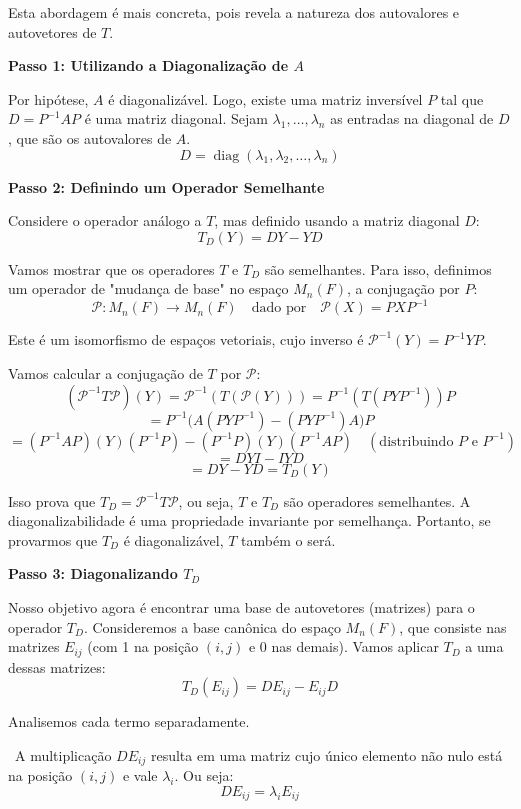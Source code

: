 Esta abordagem é mais concreta, pois revela a natureza dos autovalores e autovetores de $T$.

\textbf{Passo 1: Utilizando a Diagonalização de $A$}

Por hipótese, $A$ é diagonalizável. Logo, existe uma matriz inversível $P$ tal que
$D = P^{-1}AP$ é uma matriz diagonal. Sejam $\lambda_1, \ldots, \lambda_n$ as entradas na diagonal de $D$, que são os autovalores de $A$.
\[
D = \operatorname{diag}(\lambda_1, \lambda_2, \ldots, \lambda_n)
\]

\textbf{Passo 2: Definindo um Operador Semelhante}

Considere o operador análogo a $T$, mas definido usando a matriz diagonal $D$:
\[
T_D(Y) = DY - YD
\]

Vamos mostrar que os operadores $T$ e $T_D$ são semelhantes. Para isso, definimos um operador de
"mudança de base" no espaço $M_n(F)$, a conjugação por $P$:
\[
\mathcal{P} : M_n(F) \to M_n(F) \quad \text{dado por} \quad \mathcal{P}(X) = PXP^{-1}
\]

Este é um isomorfismo de espaços vetoriais, cujo inverso é $\mathcal{P}^{-1}(Y) = P^{-1}YP$.

Vamos calcular a conjugação de $T$ por $\mathcal{P}$:
\[
(\mathcal{P}^{-1} T \mathcal{P})(Y) = \mathcal{P}^{-1}(T(\mathcal{P}(Y)))
= P^{-1}(T(PYP^{-1}))P
\]
\[
= P^{-1}\big( A(PYP^{-1}) - (PYP^{-1})A \big)P
\]
\[
= (P^{-1}AP)(Y)(P^{-1}P) - (P^{-1}P)(Y)(P^{-1}AP) \quad (\text{distribuindo $P$ e $P^{-1}$})
\]
\[
= DYI - IYD
\]
\[
= DY - YD = T_D(Y)
\]

Isso prova que $T_D = \mathcal{P}^{-1}T\mathcal{P}$, ou seja, $T$ e $T_D$ são operadores semelhantes. A
diagonalizabilidade é uma propriedade invariante por semelhança. Portanto, se provarmos que $T_D$ é
diagonalizável, $T$ também o será.

\textbf{Passo 3: Diagonalizando $T_D$}

Nosso objetivo agora é encontrar uma base de autovetores (matrizes) para o operador $T_D$.
Consideremos a base canônica do espaço $M_n(F)$, que consiste nas matrizes $E_{ij}$ (com 1 na posição
$(i,j)$ e 0 nas demais). Vamos aplicar $T_D$ a uma dessas matrizes:
\[
T_D(E_{ij}) = DE_{ij} - E_{ij}D
\]

Analisemos cada termo separadamente.

\textbullet\ A multiplicação $DE_{ij}$ resulta em uma matriz cujo único elemento não nulo está na posição
$(i,j)$ e vale $\lambda_i$. Ou seja:
\[
DE_{ij} = \lambda_i E_{ij}
\]

